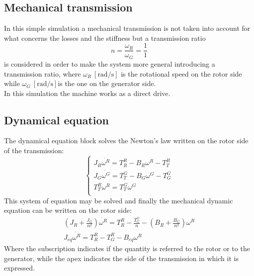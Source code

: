 \subsection{Mechanical transmission}
In this simple simulation a mechanical transmission is not taken into account for what concerns the losses and the stiffness but a transmission ratio 
\begin{equation}
    n = \frac{\omega_{R}}{\omega_{G}} = \frac{1}{1}
    \label{eq:transmission_ratio}
\end{equation}
is considered in order to make the system more general introducing a transmission ratio, where $\omega_{R} \ \left[\si{\radian\per\second}\right]$ is the rotational speed on the rotor side while $\omega_{G} \ \left[\si{\radian\per\second}\right]$is the one on the generator side.\\
In this simulation the machine works as a direct drive.

\subsection{Dynamical equation}
The dynamical equation block solves the Newton's law written on the rotor side of the transmission:
\begin{equation}
    \begin{cases}
      J_R \dot{\omega^R} = T_R^R - B_R\omega^R - T_T^R\\
      J_G \dot{\omega^G} = T_T^G - B_G\omega^G - T_G^G\\
      T_T^R\omega^R = T_T^G\omega^G\\
    \end{cases}
\end{equation}
This system of equation may be solved and finally the mechanical dynamic equation can be written on the rotor side:
\begin{gather}
    \left(J_R + \frac{J_G}{n^2}\right) \dot{\omega^R} = T_R^R - \frac{T_G^G}{n} - \left(B_R + \frac{B_G}{n^2}\right)\omega^R \\
    J_{eq} \dot{\omega^R} = T_R^R - T_G^R - B_{eq}\omega^R
    \label{eq:mech_eq}
\end{gather}
Where the subscription indicates if the quantity is referred to the rotor or to the generator, while the apex indicates the side of the transmission in which it is expressed.


